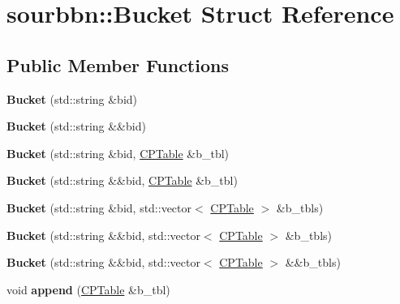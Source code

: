 \hypertarget{structsourbbn_1_1Bucket}{}\section{sourbbn\+:\+:Bucket Struct Reference}
\label{structsourbbn_1_1Bucket}
\subsection*{Public Member Functions}
\begin{DoxyCompactItemize}
\item 
\mbox{\label{structsourbbn_1_1Bucket_a632c74de8383ee2e2c26fab02a5962ba}} 
{\bfseries Bucket} (std\+::string \&bid)
\item 
\mbox{\label{structsourbbn_1_1Bucket_a61973d198869d9d1fd7f5dcfcc342cae}} 
{\bfseries Bucket} (std\+::string \&\&bid)
\item 
\mbox{\label{structsourbbn_1_1Bucket_ab07b7b82324f59048ddb2fa6c79b410b}} 
{\bfseries Bucket} (std\+::string \&bid, \hyperlink{structsourbbn_1_1CPTable}{C\+P\+Table} \&b\+\_\+tbl)
\item 
\mbox{\label{structsourbbn_1_1Bucket_a9361e6faa526a48ed3b81a7da57976da}} 
{\bfseries Bucket} (std\+::string \&\&bid, \hyperlink{structsourbbn_1_1CPTable}{C\+P\+Table} \&b\+\_\+tbl)
\item 
\mbox{\label{structsourbbn_1_1Bucket_a2b553ba424d4eddd8ce9921be7c62e49}} 
{\bfseries Bucket} (std\+::string \&bid, std\+::vector$<$ \hyperlink{structsourbbn_1_1CPTable}{C\+P\+Table} $>$ \&b\+\_\+tbls)
\item 
\mbox{\label{structsourbbn_1_1Bucket_ad511cda44fb03dfc6d989be8dc6af10c}} 
{\bfseries Bucket} (std\+::string \&\&bid, std\+::vector$<$ \hyperlink{structsourbbn_1_1CPTable}{C\+P\+Table} $>$ \&b\+\_\+tbls)
\item 
\mbox{\label{structsourbbn_1_1Bucket_a1d13ee3e3b92f331471a8c4802c827c8}} 
{\bfseries Bucket} (std\+::string \&\&bid, std\+::vector$<$ \hyperlink{structsourbbn_1_1CPTable}{C\+P\+Table} $>$ \&\&b\+\_\+tbls)
\item 
\mbox{\label{structsourbbn_1_1Bucket_a8efe97b92bf7bbe679c112bb178d4ce2}} 
void {\bfseries append} (\hyperlink{structsourbbn_1_1CPTable}{C\+P\+Table} \&b\+\_\+tbl)
\end{DoxyCompactItemize}
